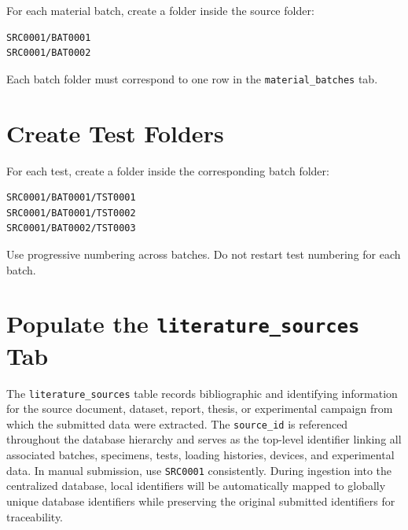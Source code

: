 \documentclass[11pt]{book}
\begin{document}
For each material batch, create a folder inside the source folder:

\begin{verbatim}
SRC0001/BAT0001
SRC0001/BAT0002
\end{verbatim}

Each batch folder must correspond to one row in the \texttt{material\_batches} tab.

\section{Create Test Folders}

For each test, create a folder inside the corresponding batch folder:

\begin{verbatim}
SRC0001/BAT0001/TST0001
SRC0001/BAT0001/TST0002
SRC0001/BAT0002/TST0003
\end{verbatim}

Use progressive numbering across batches. Do not restart test numbering for each batch.

\section{Populate the \texttt{literature\_sources} Tab}

The \texttt{literature\_sources} table records bibliographic and identifying information for the source document, dataset, report, thesis, or experimental campaign from which the submitted data were extracted. The \texttt{source\_id} is referenced throughout the database hierarchy and serves as the top-level identifier linking all associated batches, specimens, tests, loading histories, devices, and experimental data. In manual submission, use \texttt{SRC0001} consistently. During ingestion into the centralized database, local identifiers will be automatically mapped to globally unique database identifiers while preserving the original submitted identifiers for traceability.

\setlength{\tabcolsep}{4pt}
\end{document}
